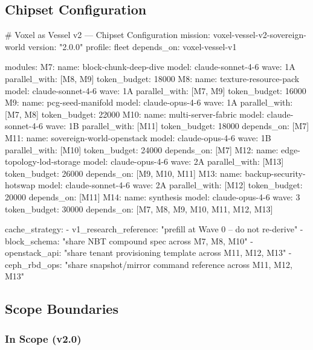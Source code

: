 \documentclass[11pt,letterpaper]{article}
\begin{document}
\subsection{Chipset Configuration}

\begin{asciibox}
# Voxel as Vessel v2 --- Chipset Configuration
mission: voxel-vessel-v2-sovereign-world
version: "2.0.0"
profile: fleet
depends_on: voxel-vessel-v1

modules:
  M7:
    name: block-chunk-deep-dive
    model: claude-sonnet-4-6
    wave: 1A
    parallel_with: [M8, M9]
    token_budget: 18000
  M8:
    name: texture-resource-pack
    model: claude-sonnet-4-6
    wave: 1A
    parallel_with: [M7, M9]
    token_budget: 16000
  M9:
    name: pcg-seed-manifold
    model: claude-opus-4-6
    wave: 1A
    parallel_with: [M7, M8]
    token_budget: 22000
  M10:
    name: multi-server-fabric
    model: claude-sonnet-4-6
    wave: 1B
    parallel_with: [M11]
    token_budget: 18000
    depends_on: [M7]
  M11:
    name: sovereign-world-openstack
    model: claude-opus-4-6
    wave: 1B
    parallel_with: [M10]
    token_budget: 24000
    depends_on: [M7]
  M12:
    name: edge-topology-lod-storage
    model: claude-opus-4-6
    wave: 2A
    parallel_with: [M13]
    token_budget: 26000
    depends_on: [M9, M10, M11]
  M13:
    name: backup-security-hotswap
    model: claude-sonnet-4-6
    wave: 2A
    parallel_with: [M12]
    token_budget: 20000
    depends_on: [M11]
  M14:
    name: synthesis
    model: claude-opus-4-6
    wave: 3
    token_budget: 30000
    depends_on: [M7, M8, M9, M10, M11, M12, M13]

cache_strategy:
  - v1_research_reference: "prefill at Wave 0 -- do not re-derive"
  - block_schema: "share NBT compound spec across M7, M8, M10"
  - openstack_api: "share tenant provisioning template across M11, M12, M13"
  - ceph_rbd_ops: "share snapshot/mirror command reference across M11, M12, M13"
\end{asciibox}

\subsection{Scope Boundaries}

\subsubsection{In Scope (v2.0)}
\end{document}
